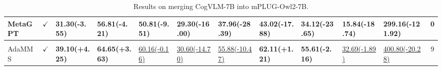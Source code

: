 \begin{table*}[!ht]
{\begin{tabular}{lclllllllllc}
        MetaGPT & $\checkmark$&31.30\footnotesize(-3.55) & 56.81\footnotesize(-4.21) & 50.81\footnotesize(-9.51) & 29.30\footnotesize(-16.00) & 37.96\footnotesize(-28.39) & 43.02\footnotesize(-17.88) & 34.12\footnotesize(-23.65) & 15.84\footnotesize(-18.74) & 299.16\footnotesize(-121.92)  &0
          \\[0.5ex] 
               \hline       
\rowcolor{gray!20}
\multicolumn{12}{c}{\textbf{Our Method}} \\
\hline                    
       AdaMMS &$\checkmark$& \textbf{39.10\footnotesize(+4.25)} & \textbf{64.65\footnotesize(+3.63)} & \underline{60.16\footnotesize(-0.16)} & \underline{30.60\footnotesize(-14.70)} & \underline{55.88\footnotesize(-10.47)} & \textbf{62.11\footnotesize(+1.21)} & \textbf{55.61\footnotesize(-2.16)} & \underline{32.69\footnotesize(-1.89)} & \underline{400.80\footnotesize(-20.28)} & 9\\
        \bottomrule
    \end{tabular}%
        }
    \caption{Results on merging CogVLM-7B into mPLUG-Owl2-7B.}
    \label{tab:cog2mplug}
\end{table*}


